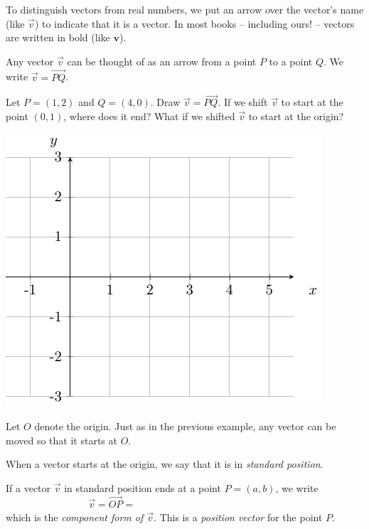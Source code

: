 \vfill

To distinguish vectors from real numbers, we put an arrow over the vector's name (like $\vec{v}$) to indicate that it is a vector.  In most books -- including ours! --  vectors are written in bold (like $\mathbf{v}$).


Any vector $\vec{v}$ can be thought of as an arrow from a point $P$ to a point $Q$. We write $\vec{v}=\vec{PQ}$.

\newcommand{\AxesForVectors}{
\begin{tikzpicture}
  \begin{axis}[grid=both,ymin=-3,ymax=3,xmax=5,xmin=-1,xtick={-1,0,1,2,3,4,5},ytick={-3,-2,-1,0,1,2,3},xticklabels={-1,0,1,2,3,4,5},yticklabels={-3,-2,-1,0,1,2,3},
               axis lines = middle,axis equal=true,xlabel=$x$,ylabel=$y$,label style =
               {at={(ticklabel cs:1.1)}}]
  \end{axis}
\end{tikzpicture}}

\begin{ex}
    Let $P=(1,2)$ and $Q=(4,0)$. Draw $\vec{v}=\vec{PQ}$. If we shift $\vec{v}$ to start at the point $(0,1)$, where does it end? What if we shifted $\vec{v}$ to start at the origin?
    
    \includegraphics[width=.3\textwidth]{tikz-pictures/section-9.2-pic1-axes-for-vectors.pdf}
\end{ex}

\pagebreak 

Let $O$ denote the origin. Just as in the previous example, any vector can be moved so that it starts at $O$.

\begin{defn}
\label{defn:position-vector}
    When a vector starts at the origin, we say that it is in \emph{standard position}.
    
    If a vector $\vec{v}$ in standard position ends at a point $P=(a,b)$, we write 
    \[
        \vec{v}=\vec{OP}=\phantom{\langle a,b\rangle,}\hspace{2in}
    \]
    which is the \emph{component form of $\vec{v}$}. This is a \emph{position vector} for the point $P$.
\end{defn}

